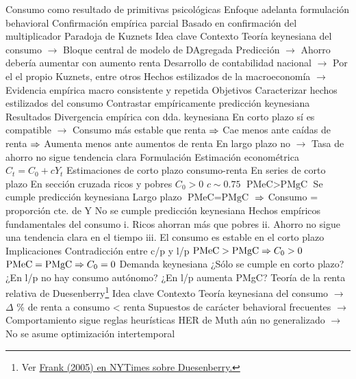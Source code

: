 \documentclass{nuevotema}
\begin{document}
\begin{esquemal}
				\4 Consumo como resultado de primitivas psicológicas
				\4[] Enfoque adelanta formulación behavioral
				\4 Confirmación empírica parcial
				\4[] Basado en confirmación del multiplicador
		\2 Paradoja de Kuznets
			\3 Idea clave
				\4 Contexto
				\4[] Teoría keynesiana del consumo
				\4[] $\to$ Bloque central de modelo de DAgregada
				\4[] Predicción
				\4[] $\to$ Ahorro debería aumentar con aumento renta
				\4[] Desarrollo de contabilidad nacional
				\4[] $\to$ Por el el propio Kuznets, entre otros
				\4[] Hechos estilizados de la macroeconomía
				\4[] $\to$ Evidencia empírica macro consistente y repetida
				\4 Objetivos
				\4[] Caracterizar hechos estilizados del consumo
				\4[] Contrastar empíricamente predicción keynesiana
				\4 Resultados
				\4[] Divergencia empírica con dda. keynesiana
				\4[] En corto plazo sí es compatible
				\4[] $\to$ Consumo más estable que renta
				\4[] $\then$ Cae menos ante caídas de renta
				\4[] $\then$ Aumenta menos ante aumentos de renta
				\4[] En largo plazo no
				\4[] $\to$ Tasa de ahorro no sigue tendencia clara
			\3 Formulación
				\4 Estimación econométrica
				\4[] $C_t = C_0 + c Y_t$
				\4 Estimaciones de corto plazo consumo-renta
				\4[] En series de corto plazo
				\4[] En sección cruzada ricos y pobres
				\4[] $C_0 >0$
				\4[] $c\sim 0.75$
				\4[] $\text{PMeC} > \text{PMgC}$
				\4[$\then$] Se cumple predicción keynesiana
				\4 Largo plazo
				\4[] $\text{PMeC} = \text{PMgC}$
				\4[] $\then$ Consumo = proporción cte. de Y
				\4[$\then$] No se cumple predicción keynesiana
				\4 Hechos empíricos fundamentales del consumo
				\4[] i. Ricos ahorran más que pobres
				\4[] ii. Ahorro no sigue una tendencia clara en el tiempo
				\4[] iii. El consumo es estable en el corto plazo
				\4[] 
			\3 Implicaciones
				\4 Contradicción entre c/p y l/p
				\4[] $\text{PMeC} > \text{PMgC} \Rightarrow C_0 > 0$
				\4[] $\text{PMeC} = \text{PMgC} \Rightarrow C_0 = 0$
				\4 Demanda keynesiana
				\4[] ¿Sólo se cumple en corto plazo?
				\4[] ¿En l/p no hay consumo autónomo?
				\4[] ¿En l/p aumenta PMgC?
		\2 Teoría de la renta relativa de Duesenberry\footnote{Ver \href{https://www.nytimes.com/2005/06/09/business/the-mysterious-disappearance-of-james-duesenberry.html}{Frank (2005) en NYTimes sobre Duesenberry.}}
			\3 Idea clave
				\4 Contexto
				\4[] Teoría keynesiana del consumo
				\4[] $\to$ $\Delta$ \% de renta a consumo < renta
				\4[] Supuestos de carácter behavioral frecuentes
				\4[] $\to$ Comportamiento sigue reglas heurísticas
				\4[] HER de Muth aún no generalizado
				\4[] $\to$ No se asume optimización intertemporal

\end{esquemal}
\end{document}
